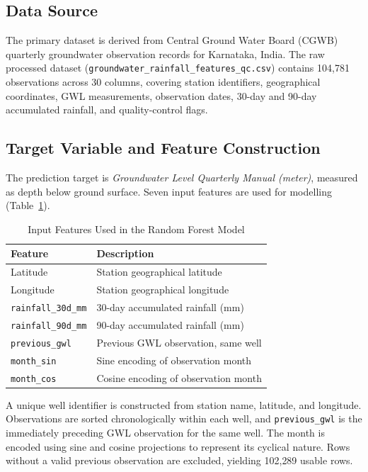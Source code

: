 \documentclass[conference]{IEEEtran}
\begin{document}
\subsection{Data Source}

The primary dataset is derived from Central Ground Water Board (CGWB)
quarterly groundwater observation records for Karnataka, India.
The raw processed dataset (\texttt{groundwater\_rainfall\_features\_qc.csv})
contains 104{,}781 observations across 30 columns, covering station
identifiers, geographical coordinates, GWL measurements, observation
dates, 30-day and 90-day accumulated rainfall, and quality-control flags.

\subsection{Target Variable and Feature Construction}

The prediction target is \emph{Groundwater Level Quarterly Manual
(meter)}, measured as depth below ground surface.
Seven input features are used for modelling (Table~\ref{tab:features}).

\begin{table}[htbp]
\centering
\caption{Input Features Used in the Random Forest Model}
\label{tab:features}
\begin{tabular}{@{}ll@{}}
\toprule
\textbf{Feature} & \textbf{Description} \\
\midrule
Latitude & Station geographical latitude \\
Longitude & Station geographical longitude \\
\texttt{rainfall\_30d\_mm} & 30-day accumulated rainfall (mm) \\
\texttt{rainfall\_90d\_mm} & 90-day accumulated rainfall (mm) \\
\texttt{previous\_gwl} & Previous GWL observation, same well \\
\texttt{month\_sin} & Sine encoding of observation month \\
\texttt{month\_cos} & Cosine encoding of observation month \\
\bottomrule
\end{tabular}
\end{table}

A unique well identifier is constructed from station name, latitude, and
longitude.
Observations are sorted chronologically within each well, and
\texttt{previous\_gwl} is the immediately preceding GWL observation for
the same well.
The month is encoded using sine and cosine projections to represent
its cyclical nature.
Rows without a valid previous observation are excluded, yielding
102{,}289 usable rows.
\end{document}
